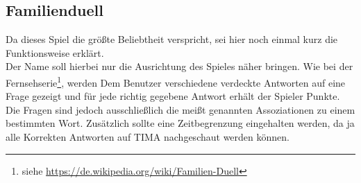\subsection*{Familienduell}
Da dieses Spiel die größte Beliebtheit verspricht, sei hier noch einmal kurz
die Funktionsweise erklärt.\\
Der Name soll hierbei nur die Ausrichtung des Spieles näher bringen.
Wie bei der
Fernsehserie\footnote{siehe \url{https://de.wikipedia.org/wiki/Familien-Duell}},
werden Dem Benutzer verschiedene verdeckte Antworten auf eine Frage gezeigt
und für jede richtig gegebene Antwort erhält der Spieler Punkte.
Die Fragen sind jedoch ausschließlich die meißt genannten Assoziationen zu einem
bestimmten Wort. Zusätzlich sollte eine Zeitbegrenzung eingehalten werden, da ja
alle Korrekten Antworten auf TIMA nachgeschaut werden können.























